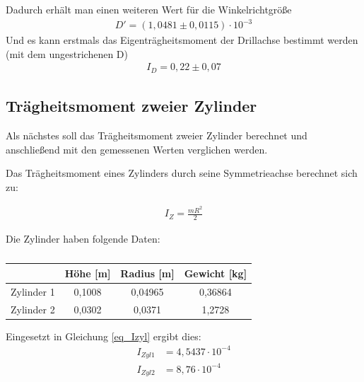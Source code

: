 Dadurch erhält man einen weiteren Wert für die Winkelrichtgröße
\begin{align*}
D'=(1,0481\pm 0,0115) \cdot10^{-3}
\end{align*}
Und es kann erstmals das Eigenträgheitsmoment der Drillachse bestimmt werden (mit dem ungestrichenen D)
\begin{align*}
I_D=0,22 \pm 0,07
\end{align*}

\subsection{Trägheitsmoment zweier Zylinder}
Als nächstes soll das Trägheitsmoment zweier Zylinder berechnet und anschließend mit den gemessenen Werten verglichen werden.

Das Trägheitsmoment eines Zylinders durch seine Symmetrieachse berechnet sich zu:

\begin{align}
I_{Z}=\frac{mR^2}{2}
\label{eq_Izyl}
\end{align}

Die Zylinder haben folgende Daten:
\begin{table}[htbp]
\begin{tabular}{|c|c|c|c|}
\hline 
 & Höhe [m] & Radius [m] & Gewicht [kg]\\ 
\hline 
Zylinder 1 & 0,1008 & 0,04965 & 0,36864 \\ 
\hline 
Zylinder 2 & 0,0302 & 0,0371 & 1,2728 \\ 
\hline 
\end{tabular} 
\caption{}
\end{table}

Eingesetzt in Gleichung \eqref{eq_Izyl} ergibt dies:
\begin{align*}
I_{Zyl 1}&=4,5437\cdot10^{-4}\\
I_{Zyl 2}&=8,76\cdot10^{-4}
\end{align*}

